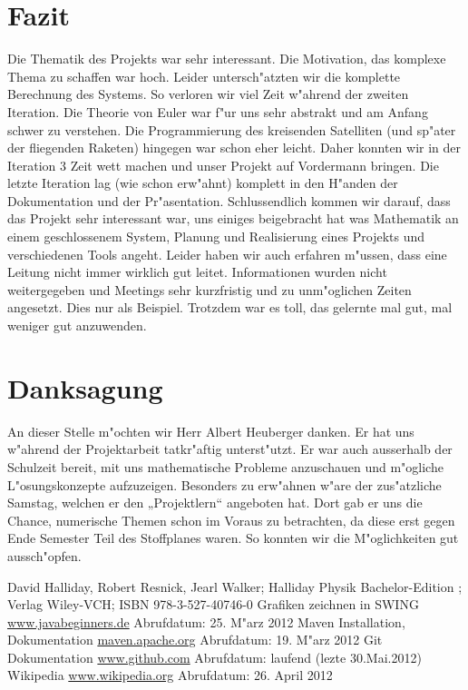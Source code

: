 \documentclass[11pt]{report}
\begin{document}
\section{Fazit}
Die Thematik des Projekts war sehr interessant. Die Motivation, das komplexe Thema zu schaffen war hoch. Leider untersch"atzten wir die komplette Berechnung des Systems. So verloren wir viel Zeit w"ahrend der zweiten Iteration. Die Theorie von Euler war f"ur uns sehr abstrakt und am Anfang schwer zu verstehen. Die Programmierung des kreisenden Satelliten (und sp"ater der fliegenden Raketen) hingegen war schon eher leicht. Daher konnten wir in der Iteration 3 Zeit wett machen und unser Projekt auf Vordermann bringen. \linebreak
Die letzte Iteration lag (wie schon erw"ahnt) komplett in den H"anden der Dokumentation und der Pr"asentation. \linebreak
Schlussendlich kommen wir darauf, dass das Projekt sehr interessant war, uns einiges beigebracht hat was Mathematik an einem geschlossenem System, Planung und Realisierung eines Projekts und verschiedenen Tools angeht. Leider haben wir auch erfahren m"ussen, dass eine Leitung nicht immer wirklich gut leitet. Informationen wurden nicht weitergegeben und Meetings sehr kurzfristig und zu unm"oglichen Zeiten angesetzt. Dies nur als Beispiel. Trotzdem war es toll, das gelernte mal gut, mal weniger gut anzuwenden.
\section{Danksagung}
An dieser Stelle m"ochten wir Herr Albert Heuberger danken. Er hat uns w"ahrend der Projektarbeit tatkr"aftig unterst"utzt. Er war auch ausserhalb der Schulzeit bereit, mit uns mathematische Probleme anzuschauen und m"ogliche L"osungskonzepte aufzuzeigen. Besonders zu erw"ahnen w"are der zus"atzliche Samstag, welchen er den „Projektlern“ angeboten hat. Dort gab er uns die Chance, numerische Themen schon im Voraus  zu betrachten, da diese erst gegen Ende Semester Teil des Stoffplanes waren. So konnten wir die M"oglichkeiten gut aussch"opfen.
\begin{thebibliography}{100}
 David Halliday, Robert Resnick, Jearl Walker; Halliday Physik Bachelor-Edition ; Verlag Wiley-VCH; ISBN 978-3-527-40746-0
 Grafiken zeichnen in SWING \linebreak \href{http://www.javabeginners.de/Grafik/geometrische_Grundformen_zeichnen.php}
{www.javabeginners.de} \linebreak Abrufdatum: 25. M"arz 2012
 Maven Installation, Dokumentation \linebreak \href{http://maven.apache.org}{maven.apache.org} \linebreak Abrufdatum: 19. M"arz 2012
 Git Dokumentation \linebreak
\href{http://www.github.com}{www.github.com} \linebreak Abrufdatum: laufend (lezte 30.Mai.2012)
 Wikipedia \linebreak
\href{http://www.wikipedia.org}{www.wikipedia.org}
\linebreak Abrufdatum: 26. April 2012
\end{thebibliography}
\end{document}
